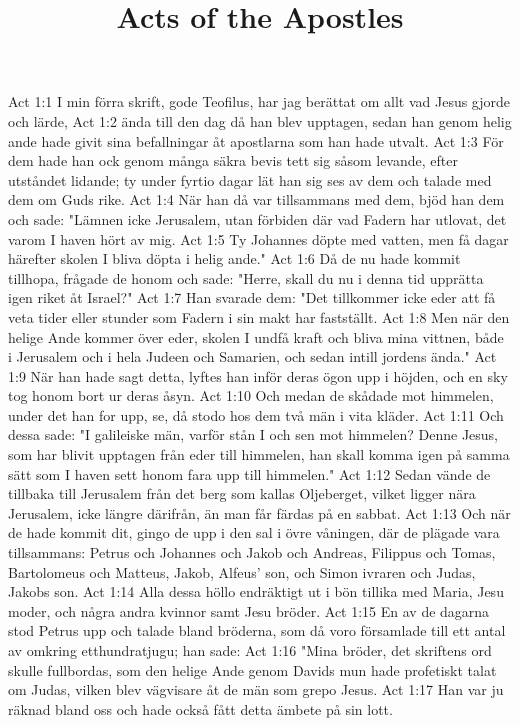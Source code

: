 

\title{Acts of the Apostles}

Act 1:1  I min förra skrift, gode Teofilus, har jag berättat om allt vad Jesus gjorde och lärde,
Act 1:2  ända till den dag då han blev upptagen, sedan han genom helig ande hade givit sina befallningar åt apostlarna som han hade utvalt.
Act 1:3  För dem hade han ock genom många säkra bevis tett sig såsom levande, efter utståndet lidande; ty under fyrtio dagar lät han sig ses av dem och talade med dem om Guds rike.
Act 1:4  När han då var tillsammans med dem, bjöd han dem och sade: "Lämnen icke Jerusalem, utan förbiden där vad Fadern har utlovat, det varom I haven hört av mig.
Act 1:5  Ty Johannes döpte med vatten, men få dagar härefter skolen I bliva döpta i helig ande."
Act 1:6  Då de nu hade kommit tillhopa, frågade de honom och sade: "Herre, skall du nu i denna tid upprätta igen riket åt Israel?"
Act 1:7  Han svarade dem: "Det tillkommer icke eder att få veta tider eller stunder som Fadern i sin makt har fastställt.
Act 1:8  Men när den helige Ande kommer över eder, skolen I undfå kraft och bliva mina vittnen, både i Jerusalem och i hela Judeen och Samarien, och sedan intill jordens ända."
Act 1:9  När han hade sagt detta, lyftes han inför deras ögon upp i höjden, och en sky tog honom bort ur deras åsyn.
Act 1:10  Och medan de skådade mot himmelen, under det han for upp, se, då stodo hos dem två män i vita kläder.
Act 1:11  Och dessa sade: "I galileiske män, varför stån I och sen mot himmelen? Denne Jesus, som har blivit upptagen från eder till himmelen, han skall komma igen på samma sätt som I haven sett honom fara upp till himmelen."
Act 1:12  Sedan vände de tillbaka till Jerusalem från det berg som kallas Oljeberget, vilket ligger nära Jerusalem, icke längre därifrån, än man får färdas på en sabbat.
Act 1:13  Och när de hade kommit dit, gingo de upp i den sal i övre våningen, där de plägade vara tillsammans: Petrus och Johannes och Jakob och Andreas, Filippus och Tomas, Bartolomeus och Matteus, Jakob, Alfeus' son, och Simon ivraren och Judas, Jakobs son.
Act 1:14  Alla dessa höllo endräktigt ut i bön tillika med Maria, Jesu moder, och några andra kvinnor samt Jesu bröder.
Act 1:15  En av de dagarna stod Petrus upp och talade bland bröderna, som då voro församlade till ett antal av omkring etthundratjugu; han sade:
Act 1:16  "Mina bröder, det skriftens ord skulle fullbordas, som den helige Ande genom Davids mun hade profetiskt talat om Judas, vilken blev vägvisare åt de män som grepo Jesus.
Act 1:17  Han var ju räknad bland oss och hade också fått detta ämbete på sin lott.
